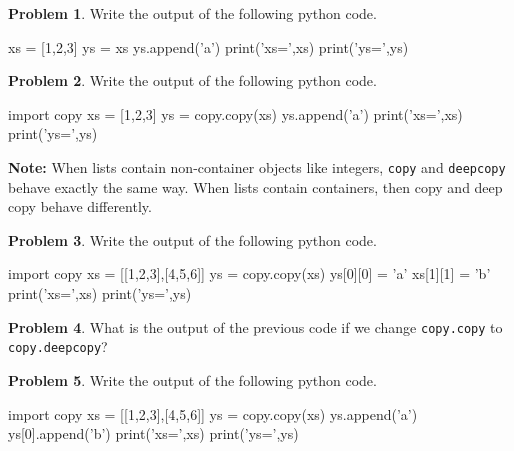 \documentclass[12pt]{article}
\theoremstyle{definition}
\newtheorem{problem}{Problem}
\begin{document}
\begin{problem}
Write the output of the following python code.
\begin{python}
xs = [1,2,3]
ys = xs
ys.append('a')
print('xs=',xs)
print('ys=',ys)
\end{python}
\end{problem}
\vspace{2in}

\begin{problem}
Write the output of the following python code.
\begin{python}
import copy
xs = [1,2,3]
ys = copy.copy(xs)
ys.append('a')
print('xs=',xs)
print('ys=',ys)
\end{python}
\end{problem}
\vspace{2in}

\newpage
\noindent
\textbf{Note:}
When lists contain non-container objects like integers, \texttt{copy} and \texttt{deepcopy} behave exactly the same way.
When lists contain containers, then copy and deep copy behave differently.

\begin{problem}
Write the output of the following python code.
\begin{python}
import copy
xs = [[1,2,3],[4,5,6]]
ys = copy.copy(xs)
ys[0][0] = 'a'
xs[1][1] = 'b'
print('xs=',xs)
print('ys=',ys)
\end{python}
\end{problem}
\vspace{2in}

\begin{problem}
What is the output of the previous code if we change \texttt{copy.copy} to \texttt{copy.deepcopy}?
\end{problem}
\vspace{2in}

\newpage
\begin{problem}
Write the output of the following python code.
\begin{python}
import copy
xs = [[1,2,3],[4,5,6]]
ys = copy.copy(xs)
ys.append('a')
ys[0].append('b')
print('xs=',xs)
print('ys=',ys)
\end{python}
\end{problem}
\vspace{2in}
\end{document}
